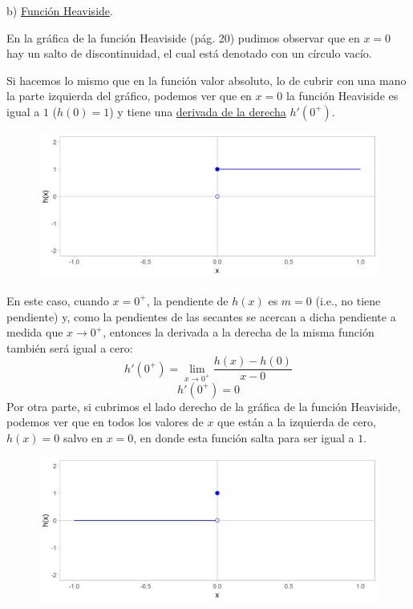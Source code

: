 \documentclass[12pt]{article}
\begin{document}
b) \underline{Función Heaviside}.

En la gráfica de la función Heaviside (pág. 20) pudimos observar que en $x = 0$ hay un salto de discontinuidad, el cual está denotado con un círculo vacío.

Si hacemos lo mismo que en la función valor absoluto, lo de cubrir con una mano la parte izquierda del gráfico, podemos ver que en $x = 0$ la función Heaviside es igual a $1$ ($h(0) = 1$) y tiene una \underline{derivada de la derecha} $h'(0^{+})$.

\newpage

\begin{figure}[hbt!]
\centering
\includegraphics[scale=0.7]{img/heaviside_right_plot.jpg}
\end{figure}

En este caso, cuando $x = 0^{+}$, la pendiente de $h(x)$ es $m = 0$ (i.e., no tiene pendiente) y, como la pendientes de las secantes se acercan a dicha pendiente a medida que $x \to 0^{+}$, entonces la derivada a la derecha de la misma función también será igual a cero:
\[h'(0^{+}) = \lim_{x \to 0^{+}} \frac{h(x)-h(0)}{x-0}\]
\[h'(0^{+}) = 0\]
Por otra parte, si cubrimos el lado derecho de la gráfica de la función Heaviside, podemos ver que en todos los valores de $x$ que están a la izquierda de cero, $h(x) = 0$ salvo en $x = 0$, en donde esta función salta para ser igual a $1$.

\begin{figure}[hbt!]
\centering
\includegraphics[scale=0.7]{img/heaviside_left_plot.jpg}
\end{figure}
\end{document}
